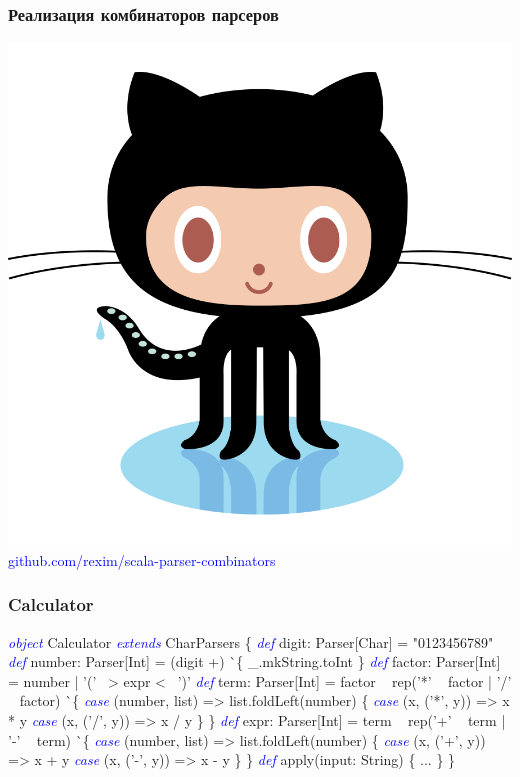 \documentclass{beamer}
\newcommand{\keyword}[1]{\textcolor{blue}{\textsl{#1}}}
\begin{document}
\begin{frame}
  \frametitle{Реализация комбинаторов парсеров}
  \includegraphics[scale=0.04]{images/octocat.png} \Large \textcolor{blue}{github.com{\huge /rexim/}scala-parser-combinators}
\end{frame}

\begin{frame}[fragile]
  \frametitle{Calculator}
\scriptsize
  \begin{semiverbatim}
\keyword{object} Calculator \keyword{extends} CharParsers \{
  \keyword{def} digit: Parser[Char] = "0123456789"
  \keyword{def} number: Parser[Int] = (digit +) ^^ \{ _.mkString.toInt \}
  \keyword{def} factor: Parser[Int] = number | '(' ~> expr <~ ')'
  \keyword{def} term: Parser[Int] = factor ~ rep('*' ~ factor | '/' ~ factor) ^^ \{
    \keyword{case} (number, list) => list.foldLeft(number) \{
      \keyword{case} (x, ('*', y)) => x * y
      \keyword{case} (x, ('/', y)) => x / y
    \}
  \}
  \keyword{def} expr: Parser[Int] = term ~ rep('+' ~ term | '-' ~ term) ^^ \{
    \keyword{case} (number, list) => list.foldLeft(number) \{
      \keyword{case} (x, ('+', y)) => x + y
      \keyword{case} (x, ('-', y)) => x - y
    \}
  \}
  \keyword{def} apply(input: String) \{ ... \}
\}
  \end{semiverbatim}
\end{frame}
\end{document}
